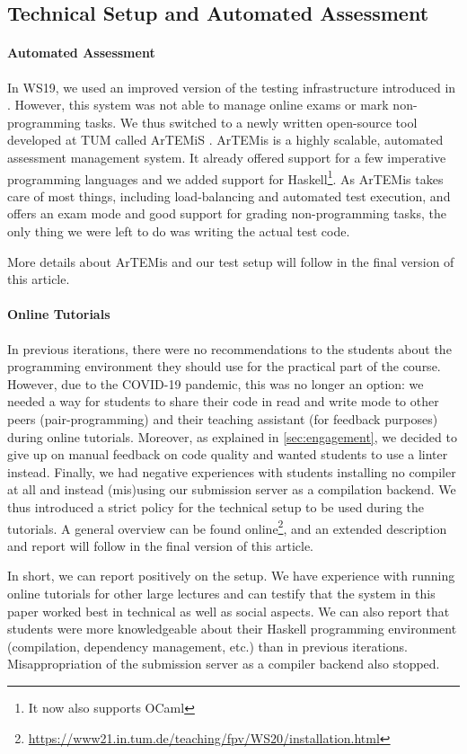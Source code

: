 \subsection{Technical Setup and Automated Assessment}\label{sec:tech_setup_test}

\paragraph{Automated Assessment}
In WS19, we used an improved version of
the testing infrastructure introduced in \cite{next_1100}.
However, this system was not able to manage online exams or mark non-programming tasks.
We thus switched to a newly written open-source
tool developed at TUM called ArTEMiS \cite{artemis}.
ArTEMis is a highly scalable, automated assessment management system.
It already offered support for a few imperative programming languages
and we added support for Haskell\footnote{It now also supports OCaml}.
As ArTEMis takes care of most things,
including load-balancing and automated test execution,
and offers an exam mode and good support for grading non-programming tasks,
the only thing we were left to do was writing the actual test code.

More details about ArTEMis and our test setup will follow
in the final version of this article.

\paragraph{Online Tutorials}
In previous iterations,
there were no recommendations to the students about the programming environment they should use for the practical part of the course.
However, due to the COVID-19 pandemic,
this was no longer an option:
we needed a way for students to share their code in read and write mode
to other peers (pair-programming) and their teaching assistant (for feedback purposes) during online tutorials.
Moreover, as explained in \cref{sec:engagement},
we decided to give up on manual feedback on code quality
and wanted students to use a linter instead.
Finally, we had negative experiences with students
installing no compiler at all
and instead (mis)using our submission server as a compilation backend.
We thus introduced a strict policy
for the technical setup to be used during
the tutorials.
A general overview can be found online\footnote{\url{https://www21.in.tum.de/teaching/fpv/WS20/installation.html}},
and an extended description and report will follow in the final version of this article.

In short, we can report positively on the setup.
We have experience with running online tutorials for other large lectures and can testify that
the system in this paper worked best in technical as well as social aspects.
We can also report that students were more knowledgeable
about their Haskell programming environment (compilation, dependency management, etc.) than in previous iterations.
Misappropriation of the submission server as a compiler backend also stopped.
